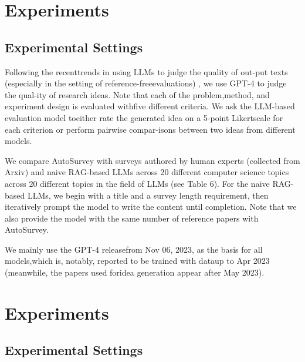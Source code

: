 \documentclass[manuscript,review,anonymous]{acmart}
\begin{document}
\section{Experiments}

\subsection{Experimental Settings}

Following the recenttrends in using LLMs to judge the quality of out-put texts (especially in the setting of reference-freeevaluations) \cite{zheng2023judging,liu2023g}, we use GPT-4 to judge the qual-ity of research ideas. Note that each of the problem,method, and experiment design is evaluated withfive different criteria. We ask the LLM-based evaluation model toeither rate the generated idea on a 5-point Likertscale for each criterion or perform pairwise compar-isons between two ideas from different models. 

We compare AutoSurvey with surveys authored by human experts (collected from Arxiv) and naive RAG-based LLMs across 20 different computer science topics across 20 different topics in
the field of LLMs (see Table 6). For the naive RAG-based LLMs, we begin with a title and a survey
length requirement, then iteratively prompt the model to write the content until completion. Note that we also provide the model with the same number of reference papers with AutoSurvey.

We mainly use the GPT-4 \cite{achiam2023gpt} releasefrom Nov 06, 2023, as the basis for all models,which is, notably, reported to be trained with dataup to Apr 2023 (meanwhile, the papers used foridea generation appear after May 2023).


\section{Experiments}

\subsection{Experimental Settings}
\end{document}
